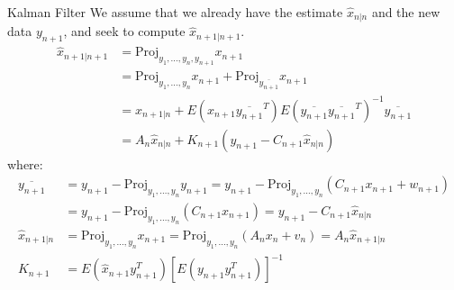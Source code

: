 \documentclass{beamer}
\begin{document}
  \begin{frame}{Kalman Filter}
    We assume that we already have the estimate \(\hat{x}_{n|n}\) and the new data \(y_{n+1}\), and seek to compute \(\hat{x}_{n+1|n+1}\).
    \begin{align*}
      \hat{x}_{n+1|n+1} &= \text{Proj}_{y_1,\ldots,y_n,y_{n+1}} x_{n+1} \\
      &= \text{Proj}_{y_1,\ldots,y_n} x_{n+1} + \text{Proj}_{\overline{y_{n+1}} } x_{n+1} \\
      &= \hat{x}_{n+1|n} + E\left(x_{n+1} \overline{y_{n+1}}^T\right) E\left(\overline{y_{n+1}}\overline{y_{n+1}}^T\right)^{-1} \overline{y_{n+1}}\\
      &= A_n \hat{x}_{n|n}+ K_{n+1}  (y_{n+1} - C_{n+1} \hat{x}_{n|n})
    \end{align*}
  where:
    \begin{align*}
    \overline{y_{n+1}}  &= y_{n+1} - \text{Proj}_{y_1,\ldots,y_n} y_{n+1}=y_{n+1} - \text{Proj}_{y_1,\ldots,y_n} (C_{n+1} x_{n+1} +w_{n+1}) \\
    &=y_{n+1} - \text{Proj}_{y_1,\ldots,y_n} (C_{n+1} x_{n+1})=y_{n+1} - C_{n+1} \hat{x}_{n|n}\\
        \hat{x}_{n+1|n} &= \text{Proj}_{y_1,\ldots,y_n} x_{n+1} = \text{Proj}_{y_1,\ldots,y_n} (A_n x_n + v_n) =A_n \hat{x}_{n+1|n} \\
        K_{n+1} &= E(\hat{x}_{n+1} y_{n+1}^T) [E(y_{n+1} y_{n+1}^T)]^{-1}
  \end{align*}
    \end{frame}
  
  
  
\end{document}
